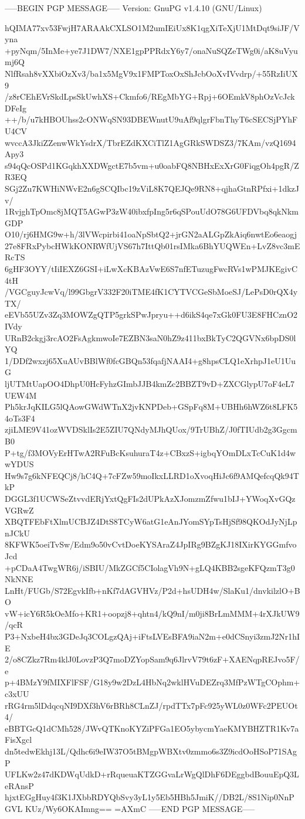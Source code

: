 -----BEGIN PGP MESSAGE-----
Version: GnuPG v1.4.10 (GNU/Linux)

hQIMA77xv53FwjH7ARAAkCXLSO1M2umIEiUx8K1qgXiTeXjU1MtDqt9siJF/Vyna
+pyNqm/5InMe+ye7J1DW7/NXE1gpPPRdxY6y7/onaNuSQZeTWg0i/aK8uVyumj6Q
NlfRsah8vXXbiOzXv3/ba1x5MgV9x1FMPToxOxShJcbOoXvIVvdrp/+55RzIiUX9
/z8rCEhEVrSkdLpsSkUwhXS+Ckmfo6/REgMbYG+Rpj+6OEmkV8phOzVcJckDFeIg
++/b/u7kHBOUhss2cONWqSN93DBEWnutU9uAf9qlgrFbnThyT6cSECSjPYhFU4CV
wvccA3JkiZZenwWkYsdrX/TbrEZdKXCiTlZ1AgGRkSWDSZ3/7KAm/vzQ1694Apy3
s94qQcOSPd1KGqkhXXDWgctE7b5vm+u0oabFQ8NBHxExXrG0FiqgOh4pgR/ZR3EQ
SGj2Zu7KWHiNWvE2n6gSCQIbc19zViL8K7QEJQe9RN8+qjhaGtnRPfxi+1dkzJv/
1RvjghTpOmc8jMQT5AGwP3zW40ibxfpIng5r6qSPouUdO78G6UFDVbq8qkNkmGDP
O10/rj6HMG9w+h/3lVWcpirbi41oaNpSbtQ2+jrGN2aALGpZkAiq6nwtEo6eaogj
27e8FRxPybcHWkKONRWfUjVS67h7IttQb01rsIMka6BhYUQWEn+LvZ8vc3mERcTS
6gHF3OYY/tIiIEXZ6GSI+iLwXcKBAzVwE6S7nfETuzugFwcRVs1wPMJKEgivC4tH
/VGCguyJcwVq/l99GbgrV332F20iTME4fK1CYTVCGeSbMoeSJ/LePsD0rQX4yTX/
eEVb55UZv3Zq3MOWZgQTP5grkSPwJpryu++d6ikS4qe7xGk0FU3E8FHCznO2IVdy
URnB2ckgj3rcAO2FsAgkmwoIe7EZBN3saN0hZ9z411bxBkTyC2QGVNx6bpDS0lYQ
1/DDf2wxzj65XuAUvBBlWf0fcGBQn53fqafjNAAI4+g8hpsCLQ1eXrhpJ1eU1UuG
ljUTMtUapOO4DhpU0HcFyhzGImbJJB4kmZc2BBZT9vD+ZXCGlypU7oF4eL7UEW4M
Ph5krJqKILG5lQAowGWdWTnX2jvKNPDeb+GSpFq8M+UBHh6hWZ6t8LFK54oTs3F4
zjiLME9V41ozWVDSklIs2E5ZIU7QNdyMJhQUox/9TrUBhZ/J0fTIUdb2g3GgcmB0
P+tg/f3MOVyErHTwA2RFuBcKsuhuraT4z+CBxzS+igbqYOmDLxTcCuK1d4wwYDUS
Hw9s7g6kNFEQCj8/hC4Q+7cFZw59moIkxLLRD1oXvoqHiJc6f9AMQefcqQk94TkP
DGGL3f1UCWSeZtvvdERjYxtQgFIs2dUPkAzXJomzmZfwu1bIJ+YWoqXvGQzVGRwZ
XBQTFEbFtXlmUCBJZ4DtS8TCyW6atG1eAnJYomSYpTsHjSf98QKOdJyNjLpnJCkU
8KFWK5oeiTvSw/Edm9o50vCvtDoeKYSAraZ4JpIRg9BZgKJ18IXirKYGGmfvoJcd
+pCDaA4TwgWR6j/iSBIU/MkZGCf5CIolagVh9N+gLQ4KBB2sgeKFQzmT3g0NkNNE
LnHt/FUGb/S72EgvkIfb+nKf7dAGVHVz/P2d+hsUDH4w/SlaKu1/dnvkilzlO+BO
vW+icY6R5kOeMfo+KR1+oopzj8+qhtn4/kQ9nI/m0ji8BrLmMMM+4rXJkUW9/qcR
P3+NxbeH4bx3GDeJq3COLgzQAj+iFtsLVEsBFA9iaN2m+e0dCSnyi3zmJ2Nr1hIE
2/o8CZkz7Rm4klJ0LovzP3Q7moDZYopSam9q6JlrvV79t6zF+XAENqpREJvo5F/e
p+4BMzY9fMIXFlFSF/G18y9w2DzL4HbNq2wklHVuDEZrq3MfPzWTgCOphm+c3xUU
rRG4rm5lDdqcqNI9DXf3hV6rBRh8CLnZJ/rpdTTx7pFc925yWL0z0WFc2PEUOt4/
eBBTGcQ1dCMh528/JWvQTKnoKYZiPFGa1EO5ybycmYaeKMYBHZTR1Kv7aFisXgcl
dn5tedwEkhj13L/Qdhc6i9eIW37O5tBMgpWBXtv0zmmo6s3Z9icdOoHSoP71SAgP
UFLKw2z47dKDWqUdkD+rRqueuaKTZGGvaLrWgQlDhF6DEggbdBouuEpQ3LeRAnsP
hjxtEGgHuy4f3K1JXbbRDYQbSvy3yL1y5Eb5HBh5JmiK//DB2L/8S1Nip0NnPGVL
KUz/Wy6OKAImng==
=AXmC
-----END PGP MESSAGE-----
